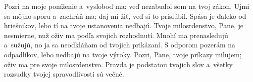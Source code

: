 Pozri na moje poníženie a~vysloboď ma;
veď nezabudol som na tvoj zákon.
\versseparator
Ujmi sa môjho sporu a~zachráň ma;
daj mi žiť, veď si to prisľúbil.
\versseparator
Spása je ďaleko od hriešnikov,
lebo tí na tvoje ustanovenia nedbajú.
\versseparator
Tvoje milosrdenstvo, Pane, je nesmierne,
nuž oživ ma podľa svojich rozhodnutí.
\versseparator
Mnohí ma prenasledujú a~sužujú,
no ja sa neodkláňam od tvojich prikázaní.
\versseparator
S odporom pozerám na odpadlíkov,
lebo nedbajú na tvoje výroky.
\versseparator
Pozri, Pane, tvoje príkazy milujem;
oživ ma pre svoje milosrdenstvo.
\versseparator
Pravda je podstatou tvojich slov
a~všetky rozsudky tvojej spravodlivosti sú večné.